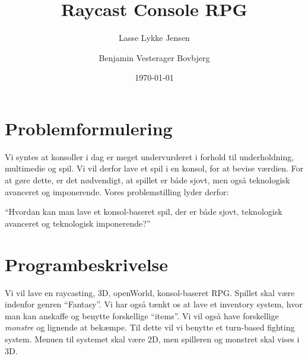 \documentclass[11pt]{article}
\author{Lasse Lykke Jensen \and Benjamin Vesterager Bovbjerg}
\date{\today}
\title{Raycast Console RPG}
\begin{document}
\maketitle

\section*{Problemformulering}
Vi syntes at konsoller i dag er meget undervurderet i forhold til underholdning,
multimedie og spil. Vi vil derfor lave et spil i en konsol, for at bevise
værdien. For at gøre dette, er det nødvendigt, at spillet er både sjovt, men
også teknologisk avanceret og imponerende. Vores problemstilling lyder derfor:

``Hvordan kan man lave et konsol-baseret spil, der er både sjovt, teknologisk
avanceret og teknologisk imponerende?''

\section*{Programbeskrivelse}
Vi vil lave en raycasting, 3D, openWorld, konsol-baseret RPG. Spillet skal være
indenfor genren ``Fantasy''. Vi har også tænkt os at lave et inventory system,
hvor man kan anskaffe og benytte forskellige ``items''. Vi vil også have
forskellige \textit{monstre} og lignende at bekæmpe. Til dette vil vi benytte et
turn-based fighting system. Menuen til systemet skal være 2D, men spilleren og
monstret skal vises i 3D.
\end{document}
